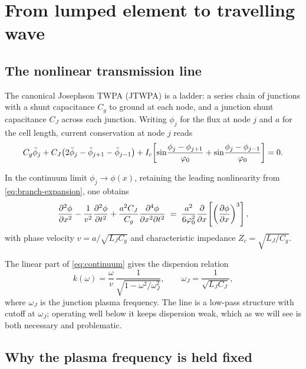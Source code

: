 \section{From lumped element to travelling wave}

\subsection{The nonlinear transmission line}

The canonical Josephson TWPA (JTWPA) is a ladder: a series chain of junctions
with a shunt capacitance $C_g$ to ground at each node, and a junction shunt
capacitance $C_J$ across each junction. Writing $\phi_j$ for the flux at node
$j$ and $a$ for the cell length, current conservation at node $j$ reads
\begin{equation}
  C_g\ddot{\phi}_j
  + C_J\!\left(2\ddot{\phi}_j - \ddot{\phi}_{j+1} - \ddot{\phi}_{j-1}\right)
  + I_c\!\left[
      \sin\!\frac{\phi_j-\phi_{j+1}}{\varphi_{0}}
    + \sin\!\frac{\phi_j-\phi_{j-1}}{\varphi_{0}}
    \right] = 0 .
  \label{eq:jtwpa-node}
\end{equation}

In the continuum limit $\phi_j \to \phi(x)$, retaining the leading nonlinearity
from \eqref{eq:branch-expansion}, one obtains
\begin{equation}
  \frac{\partial^{2}\phi}{\partial x^{2}}
  - \frac{1}{v^{2}}\frac{\partial^{2}\phi}{\partial t^{2}}
  + \frac{a^{2}C_J}{C_g}\frac{\partial^{4}\phi}{\partial x^{2}\partial t^{2}}
  \;=\;
  \frac{a^{2}}{6\varphi_{0}^{2}}
  \frac{\partial}{\partial x}\!\left[
    \left(\frac{\partial\phi}{\partial x}\right)^{3}
  \right],
  \label{eq:continuum}
\end{equation}
with phase velocity $v = a/\sqrt{L_J C_g}$ and characteristic impedance
$Z_c = \sqrt{L_J/C_g}$.

The linear part of \eqref{eq:continuum} gives the dispersion relation
\begin{equation}
  k(\omega) = \frac{\omega}{v}\,
  \frac{1}{\sqrt{1 - \omega^{2}/\omega_{J}^{2}}},
  \qquad
  \omega_J = \frac{1}{\sqrt{L_J C_J}},
  \label{eq:dispersion}
\end{equation}
where $\omega_J$ is the junction plasma frequency. The line is a low-pass
structure with cutoff at $\omega_J$; operating well below it keeps dispersion
weak, which as we will see is both necessary and problematic.

\subsection{Why the plasma frequency is held fixed}

